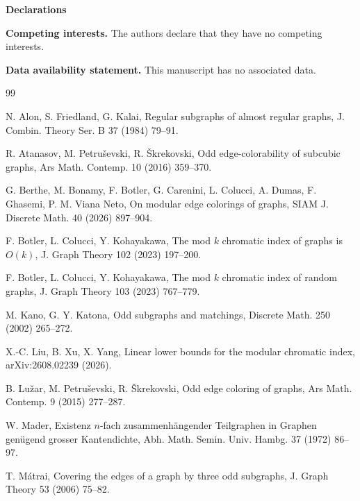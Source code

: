 \documentclass[11pt]{article}
\begin{document}
\vspace{2mm}\noindent\textbf{Declarations}

\vspace{2mm}\noindent\textbf{Competing interests.}
The authors declare that they have no competing interests.

\vspace{2mm}\noindent\textbf{Data availability statement.}
This manuscript has no associated data.

\label{sec:references}
\begin{thebibliography}{99}

N. Alon, S. Friedland, G. Kalai,
Regular subgraphs of almost regular graphs,
J. Combin. Theory Ser. B 37 (1984) 79--91.

R. Atanasov, M. Petru\v{s}evski, R. \v{S}krekovski,
Odd edge-colorability of subcubic graphs,
Ars Math. Contemp. 10 (2016) 359--370.

G. Berthe, M. Bonamy, F. Botler, G. Carenini, L. Colucci, A. Dumas,
F. Ghasemi, P. M. Viana Neto,
On modular edge colorings of graphs,
SIAM J. Discrete Math. 40 (2026) 897--904.

F. Botler, L. Colucci, Y. Kohayakawa,
The mod $k$ chromatic index of graphs is $O(k)$,
J. Graph Theory 102 (2023) 197--200.

F. Botler, L. Colucci, Y. Kohayakawa,
The mod $k$ chromatic index of random graphs,
J. Graph Theory 103 (2023) 767--779.

M. Kano, G. Y. Katona,
Odd subgraphs and matchings,
Discrete Math. 250 (2002) 265--272.

X.-C. Liu, B. Xu, X. Yang,
Linear lower bounds for the modular chromatic index,
arXiv:2608.02239 (2026).

B. Lu\v{z}ar, M. Petru\v{s}evski, R. \v{S}krekovski,
Odd edge coloring of graphs,
Ars Math. Contemp. 9 (2015) 277--287.

W. Mader,
Existenz $n$-fach zusammenh\"an\-gender Teil\-graphen in Graphen gen\"u\-gend
grosser Kanten\-dichte,
Abh. Math. Semin. Univ. Hambg. 37 (1972) 86--97.

T. M\'atrai,
Covering the edges of a graph by three odd subgraphs,
J. Graph Theory 53 (2006) 75--82.


\end{thebibliography}
\end{document}
